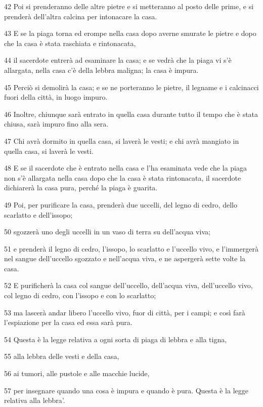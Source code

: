 \par 42 Poi si prenderanno delle altre pietre e si metteranno al posto delle prime, e si prenderà dell'altra calcina per intonacare la casa.
\par 43 E se la piaga torna ed erompe nella casa dopo averne smurate le pietre e dopo che la casa è stata raschiata e rintonacata,
\par 44 il sacerdote entrerà ad esaminare la casa; e se vedrà che la piaga vi s'è allargata, nella casa c'è della lebbra maligna; la casa è impura.
\par 45 Perciò si demolirà la casa; e se ne porteranno le pietre, il legname e i calcinacci fuori della città, in luogo impuro.
\par 46 Inoltre, chiunque sarà entrato in quella casa durante tutto il tempo che è stata chiusa, sarà impuro fino alla sera.
\par 47 Chi avrà dormito in quella casa, si laverà le vesti; e chi avrà mangiato in quella casa, si laverà le vesti.
\par 48 E se il sacerdote che è entrato nella casa e l'ha esaminata vede che la piaga non s'è allargata nella casa dopo che la casa è stata rintonacata, il sacerdote dichiarerà la casa pura, perché la piaga è guarita.
\par 49 Poi, per purificare la casa, prenderà due uccelli, del legno di cedro, dello scarlatto e dell'issopo;
\par 50 sgozzerà uno degli uccelli in un vaso di terra su dell'acqua viva;
\par 51 e prenderà il legno di cedro, l'issopo, lo scarlatto e l'uccello vivo, e l'immergerà nel sangue dell'uccello sgozzato e nell'acqua viva, e ne aspergerà sette volte la casa.
\par 52 E purificherà la casa col sangue dell'uccello, dell'acqua viva, dell'uccello vivo, col legno di cedro, con l'issopo e con lo scarlatto;
\par 53 ma lascerà andar libero l'uccello vivo, fuor di città, per i campi; e così farà l'espiazione per la casa ed essa sarà pura.
\par 54 Questa è la legge relativa a ogni sorta di piaga di lebbra e alla tigna,
\par 55 alla lebbra delle vesti e della casa,
\par 56 ai tumori, alle pustole e alle macchie lucide,
\par 57 per insegnare quando una cosa è impura e quando è pura. Questa è la legge relativa alla lebbra'.

